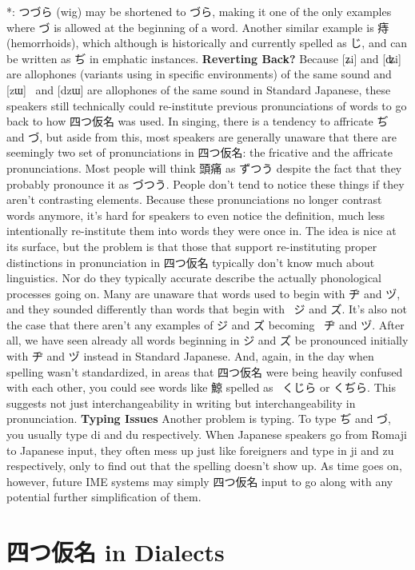  *: つづら (wig) may be shortened to づら, making it one of the only examples where づ is allowed at the beginning of a word. Another similar example is 痔 (hemorrhoids), which although is historically and currently spelled as じ, and can be written as ぢ in emphatic instances.  \textbf{Reverting Back? }  Because [ʑi] and [ʥi] are allophones (variants using in specific environments) of the same sound and [zɯ]  and [dzɯ] are allophones of the same sound in Standard Japanese, these speakers still technically could re-institute previous pronunciations of words to go back to how 四つ仮名 was used. In singing, there is a tendency to affricate ぢ and づ, but aside from this, most speakers are generally unaware that there are seemingly two set of pronunciations in 四つ仮名: the fricative and the affricate pronunciations.   Most people will think 頭痛 as ずつう despite the fact that they probably pronounce it as づつう. People don't tend to notice these things if they aren't contrasting elements. Because these pronunciations no longer contrast words anymore, it's hard for speakers to even notice the definition, much less intentionally re-institute them into words they were once in.    The idea is nice at its surface, but the problem is that those that support re-instituting proper distinctions in pronunciation in 四つ仮名 typically don't know much about linguistics. Nor do they typically accurate describe the actually phonological processes going on. Many are unaware that words used to begin with ヂ and ヅ, and they sounded differently than words that begin with  ジ and ズ.   It's also not the case that there aren't any examples of ジ and ズ becoming  ヂ and ヅ. After all, we have seen already all words beginning in ジ and ズ be pronounced initially with ヂ and ヅ instead in Standard Japanese. And, again, in the day when spelling wasn't standardized, in areas that 四つ仮名 were being heavily confused with each other, you could see words like 鯨 spelled as  くじら or くぢら. This suggests not just interchangeability in writing but interchangeability in pronunciation.  \textbf{Typing Issues }   Another problem is typing. To type ぢ and づ, you usually type di and du respectively. When Japanese speakers go from Romaji to Japanese input, they often mess up just like foreigners and type in ji and zu respectively, only to find out that the spelling doesn't show up. As time goes on, however, future IME systems may simply 四つ仮名 input to go along with any potential further simplification of them.       
\section{四つ仮名 in Dialects}
 
